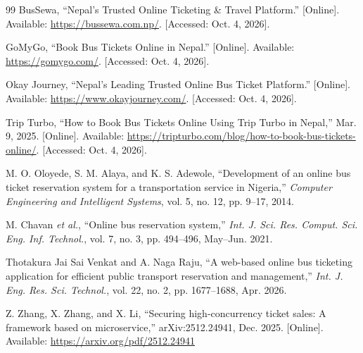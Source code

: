 \renewcommand{\bibname}{\hfill REFERENCES\hfill\mbox{}}
\clearpage
{}

\begin{thebibliography}{99}
   BusSewa, ``Nepal's Trusted Online Ticketing \& Travel Platform.'' [Online]. Available: \url{https://bussewa.com.np/}. [Accessed: Oct. 4, 2026].

   GoMyGo, ``Book Bus Tickets Online in Nepal.'' [Online]. Available: \url{https://gomygo.com/}. [Accessed: Oct. 4, 2026].

   Okay Journey, ``Nepal's Leading Trusted Online Bus Ticket Platform.'' [Online]. Available: \url{https://www.okayjourney.com/}. [Accessed: Oct. 4, 2026].

   Trip Turbo, ``How to Book Bus Tickets Online Using Trip Turbo in Nepal,'' Mar. 9, 2025. [Online]. Available: \url{https://tripturbo.com/blog/how-to-book-bus-tickets-online/}. [Accessed: Oct. 4, 2026].

   M. O. Oloyede, S. M. Alaya, and K. S. Adewole, ``Development of an online bus ticket reservation system for a transportation service in Nigeria,'' \textit{Computer Engineering and Intelligent Systems}, vol. 5, no. 12, pp. 9--17, 2014.

   M. Chavan \textit{et al.}, ``Online bus reservation system,'' \textit{Int. J. Sci. Res. Comput. Sci. Eng. Inf. Technol.}, vol. 7, no. 3, pp. 494--496, May--Jun. 2021.

   Thotakura Jai Sai Venkat and A. Naga Raju, ``A web-based online bus ticketing application for efficient public transport reservation and management,'' \textit{Int. J. Eng. Res. Sci. Technol.}, vol. 22, no. 2, pp. 1677--1688, Apr. 2026.

   Z. Zhang, X. Zhang, and X. Li, ``Securing high-concurrency ticket sales: A framework based on microservice,'' arXiv:2512.24941, Dec. 2025. [Online]. Available: \url{https://arxiv.org/pdf/2512.24941}
\end{thebibliography}
